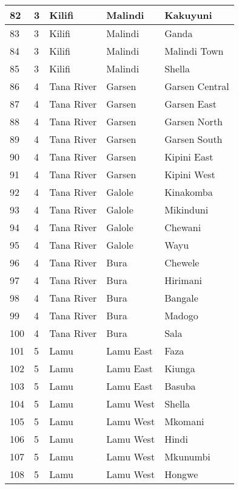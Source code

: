 \begin{table}[!ht]
\begin{tabular}{|l|l|l|l|l|}
        82 & 3 & Kilifi & Malindi & Kakuyuni \\ \hline
        83 & 3 & Kilifi & Malindi & Ganda \\ \hline
        84 & 3 & Kilifi & Malindi & Malindi Town \\ \hline
        85 & 3 & Kilifi & Malindi & Shella \\ \hline
        86 & 4 & Tana River & Garsen & Garsen Central \\ \hline
        87 & 4 & Tana River & Garsen & Garsen East \\ \hline
        88 & 4 & Tana River & Garsen & Garsen North \\ \hline
        89 & 4 & Tana River & Garsen & Garsen South \\ \hline
        90 & 4 & Tana River & Garsen & Kipini East \\ \hline
        91 & 4 & Tana River & Garsen & Kipini West \\ \hline
        92 & 4 & Tana River & Galole & Kinakomba \\ \hline
        93 & 4 & Tana River & Galole & Mikinduni \\ \hline
        94 & 4 & Tana River & Galole & Chewani \\ \hline
        95 & 4 & Tana River & Galole & Wayu \\ \hline
        96 & 4 & Tana River & Bura & Chewele \\ \hline
        97 & 4 & Tana River & Bura & Hirimani \\ \hline
        98 & 4 & Tana River & Bura & Bangale \\ \hline
        99 & 4 & Tana River & Bura & Madogo \\ \hline
        100 & 4 & Tana River & Bura & Sala \\ \hline
        101 & 5 & Lamu & Lamu East & Faza \\ \hline
        102 & 5 & Lamu & Lamu East & Kiunga \\ \hline
        103 & 5 & Lamu & Lamu East & Basuba \\ \hline
        104 & 5 & Lamu & Lamu West & Shella \\ \hline
        105 & 5 & Lamu & Lamu West & Mkomani \\ \hline
        106 & 5 & Lamu & Lamu West & Hindi \\ \hline
        107 & 5 & Lamu & Lamu West & Mkunumbi \\ \hline
        108 & 5 & Lamu & Lamu West & Hongwe \\ \hline

\end{tabular}
\end{table}
